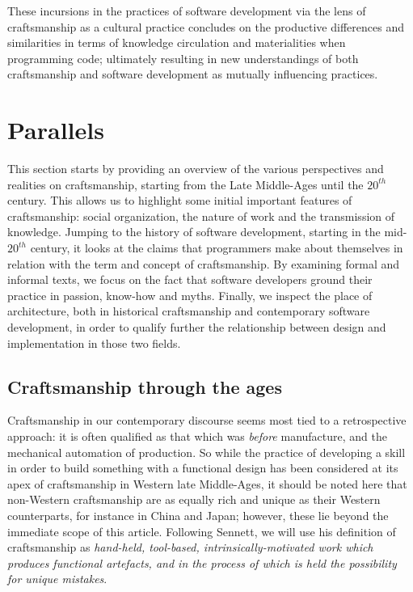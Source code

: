 \documentclass{article}
\begin{document}
These incursions in the practices of software development via the lens of craftsmanship as a cultural practice concludes on the productive differences and similarities in terms of knowledge circulation and materialities when programming code; ultimately resulting in new understandings of both craftsmanship and software development as mutually influencing practices.

\section{Parallels}

This section starts by providing an overview of the various perspectives and realities on craftsmanship, starting from the Late Middle-Ages until the $20^{th}$ century. This allows us to highlight some initial important features of craftsmanship: social organization, the nature of work and the transmission of knowledge. Jumping to the history of software development, starting in the mid-$20^{th}$ century, it looks at the claims that programmers make about themselves in relation with the term and concept of craftsmanship. By examining formal and informal texts, we focus on the fact that software developers ground their practice in passion, know-how and myths. Finally, we inspect the place of architecture, both in historical craftsmanship and contemporary software development, in order to qualify further the relationship between design and implementation in those two fields.

\subsection{Craftsmanship through the ages}

Craftsmanship in our contemporary discourse seems most tied to a retrospective approach: it is often qualified as that which was \emph{before} manufacture, and the mechanical automation of production\cite{thompson_study_1934}. So while the practice of developing a skill in order to build something with a functional design has been considered at its apex of craftsmanship in Western late Middle-Ages, it should be noted here that non-Western craftsmanship are as equally rich and unique as their Western counterparts, for instance in China\cite{zhang_jingdezhens_2015} and Japan\cite{jordan_copying_2003}; however, these lie beyond the immediate scope of this article. Following Sennett, we will use his definition of craftsmanship as \emph{hand-held, tool-based, intrinsically-motivated work which produces functional artefacts, and in the process of which is held the possibility for unique mistakes}\cite{sennett_craftsman_2009}.
\end{document}
